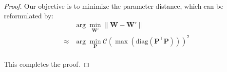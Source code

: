 \begin{proof}
Our objective is to minimize the parameter distance, which can be reformulated by:
\begin{equation}
    \begin{aligned}
    &\arg \min_{\mathbf{W}'} \| \mathbf{W} - \mathbf{W}' \|\\
    \approx&\arg \min_{\mathbf{P}} \mathcal{C}(\max (\text{diag}(\mathbf{\mathbf{P}^\top\mathbf{P}})))^2\\
    \end{aligned}
\end{equation}

This completes the proof.   
\end{proof}
    




